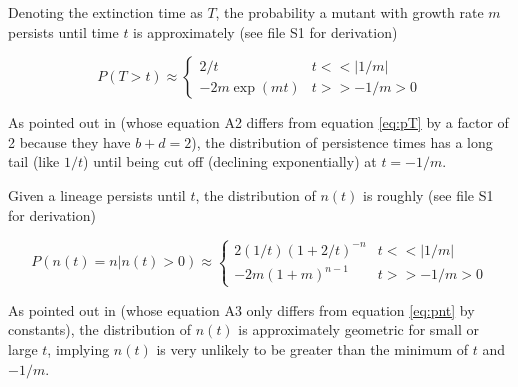 \documentclass[9pt,twocolumn,twoside,lineno]{gsajnl}
\begin{document}
Denoting the extinction time as $T$, the probability a mutant with growth rate $m$ persists until time $t$ is approximately (see file S1 for derivation)

\begin{equation}\label{eq:pT}
P( T > t ) \approx 
\begin{cases}
	2 / t & t << |1/m| \\
	-2 m \exp(m t) & t >> -1/m > 0
\end{cases}
\end{equation}

\noindent As pointed out in \cite{Weissman2010} (whose equation A2 differs from equation \ref{eq:pT} by a factor of 2 because they have $b+d=2$), the distribution of persistence times has a long tail (like $1/t$) until being cut off (declining exponentially) at $t=-1/m$.

Given a lineage persists until $t$, the distribution of $n(t)$ is roughly (see file S1 for derivation)

\begin{equation}\label{eq:pnt}
P( n(t) = n | n(t) > 0 ) \approx 
\begin{cases}
	2 (1/t) (1 + 2/t)^{-n} & t << |1/m| \\
	-2 m (1 + m)^{n-1} & t >> -1/m > 0
\end{cases}
\end{equation}

\noindent As pointed out in \cite{Weissman2010} (whose equation A3 only differs from equation \ref{eq:pnt} by constants), the distribution of $n(t)$ is approximately geometric for small or large $t$, implying $n(t)$ is very unlikely to be greater than the minimum of $t$ and $-1/m$.

\setcounter{figure}{0}
\renewcommand{\thefigure}{S\arabic{figure}}
\setcounter{table}{0}
\renewcommand{\thetable}{S\arabic{table}}
\end{document}
